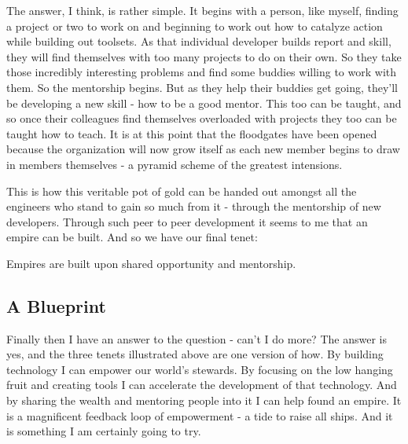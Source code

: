 \documentclass[10pt,a5paper]{book}
\begin{document}
The answer, I think, is rather simple. It begins with a person, like myself, finding a project or two to work on and beginning to work out how to catalyze action while building out toolsets. As that individual developer builds report and skill, they will find themselves with too many projects to do on their own. So they take those incredibly interesting problems and find some buddies willing to work with them. So the mentorship begins. But as they help their buddies get going, they'll be developing a new skill - how to be a good mentor. This too can be taught, and so once their colleagues find themselves overloaded with projects they too can be taught how to teach. It is at this point that the floodgates have been opened because the organization will now grow itself as each new member begins to draw in members themselves - a pyramid scheme of the greatest intensions. 

This is how this veritable pot of gold can be handed out amongst all the engineers who stand to gain so much from it - through the mentorship of new developers. Through such peer to peer development it seems to me that an empire can be built. And so we have our final tenet:

Empires are built upon shared opportunity and mentorship.

\subsection{A Blueprint}
Finally then I have an answer to the question - can't I do more? The answer is yes, and the three tenets illustrated above are one version of how. By building technology I can empower our world's stewards. By focusing on the low hanging fruit and creating tools I can accelerate the development of that technology. And by sharing the wealth and mentoring people into it I can help found an empire. It is a magnificent feedback loop of empowerment - a tide to raise all ships. And it is something I am certainly going to try. 
\end{document}
